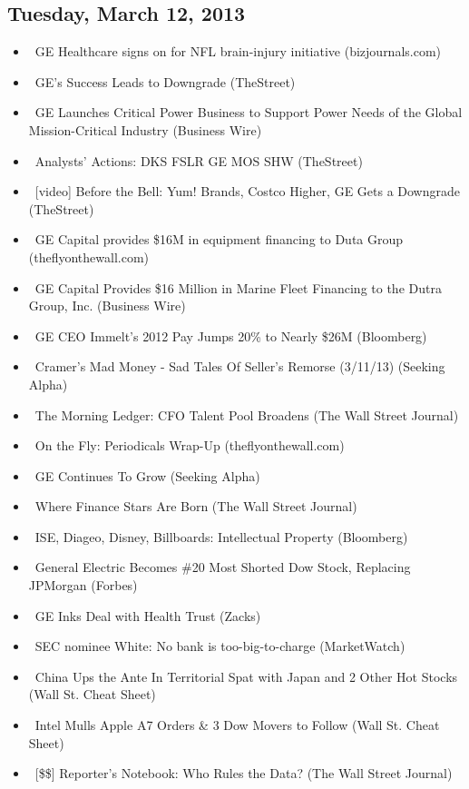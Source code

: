 \documentclass[11pt,asymmetric]{article}
\begin{document}
\subsection*{Tuesday, March 12, 2013}
\begin{itemize}
\item\ GE Healthcare signs on for NFL brain-injury initiative (bizjournals.com)
\item\ GE's Success Leads to Downgrade (TheStreet)
\item\ GE Launches Critical Power Business to Support Power Needs of the Global Mission-Critical Industry (Business Wire)
\item\ Analysts' Actions: DKS FSLR GE MOS SHW (TheStreet)
\item\ [video] Before the Bell: Yum! Brands, Costco Higher, GE Gets a Downgrade (TheStreet)
\item\ GE Capital provides \$16M in equipment financing to Duta Group (theflyonthewall.com)
\item\ GE Capital Provides \$16 Million in Marine Fleet Financing to the Dutra Group, Inc. (Business Wire)
\item\ GE CEO Immelt's 2012 Pay Jumps 20\% to Nearly \$26M (Bloomberg)
\item\ Cramer's Mad Money - Sad Tales Of Seller's Remorse (3/11/13) (Seeking Alpha)
\item\ The Morning Ledger: CFO Talent Pool Broadens (The Wall Street Journal)
\item\ On the Fly: Periodicals Wrap-Up (theflyonthewall.com)
\item\ GE Continues To Grow (Seeking Alpha)
\item\ Where Finance Stars Are Born (The Wall Street Journal)
\item\ ISE, Diageo, Disney, Billboards: Intellectual Property (Bloomberg)
\item\ General Electric Becomes \#20 Most Shorted Dow Stock, Replacing JPMorgan (Forbes)
\item\ GE Inks Deal with Health Trust (Zacks)
\item\ SEC nominee White: No bank is too-big-to-charge (MarketWatch)
\item\ China Ups the Ante In Territorial Spat with Japan and 2 Other Hot Stocks (Wall St. Cheat Sheet)
\item\ Intel Mulls Apple A7 Orders \& 3 Dow Movers to Follow (Wall St. Cheat Sheet)
\item\ [\$\$] Reporter's Notebook: Who Rules the Data? (The Wall Street Journal)

\end{itemize}
\end{document}
